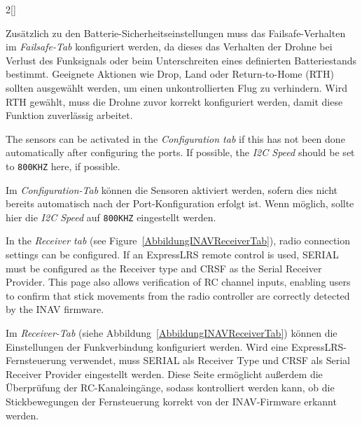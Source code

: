 \begin{paracol}{2}[]
\colger

Zusätzlich zu den Batterie-Sicherheitseinstellungen muss das Failsafe-Verhalten im \textsl{Failsafe-Tab} konfiguriert werden, da dieses das Verhalten der Drohne bei Verlust des Funksignals oder beim Unterschreiten eines definierten Batteriestands bestimmt. Geeignete Aktionen wie Drop, Land oder Return-to-Home (RTH) sollten ausgewählt werden, um einen unkontrollierten Flug zu verhindern. Wird RTH gewählt, muss die Drohne zuvor korrekt konfiguriert werden, damit diese Funktion zuverlässig arbeitet.

\coleng

The sensors can be activated in the \textsl{Configuration tab} if this has not been done automatically after configuring the ports. If possible, the \textsl{I2C Speed} should be set to \texttt{800KHZ} here, if possible.

\colger

Im \textsl{Configuration-Tab} können die Sensoren aktiviert werden, sofern dies nicht bereits automatisch nach der Port-Konfiguration erfolgt ist. Wenn möglich, sollte hier die \textsl{I2C Speed} auf \texttt{800KHZ} eingestellt werden.

\colende

\renewcommand{\deutschertitel}{Schritt 6: Konfiguration der Fernsteuerung}
\renewcommand{\englischertitel}{Step 6: Radio Configuration}
\makrounterabschnitt
\label{InavRadioConfig}

\coleng

In the \textsl{Receiver tab} (see Figure~\ref{AbbildungINAVReceiverTab}), radio connection settings can be configured. If an ExpressLRS remote control is used, SERIAL must be configured as the Receiver type and CRSF as the Serial Receiver Provider. This page also allows verification of RC channel inputs, enabling users to confirm that stick movements from the radio controller are correctly detected by the INAV firmware.

\colger

Im \textsl{Receiver-Tab} (siehe Abbildung~\ref{AbbildungINAVReceiverTab}) können die Einstellungen der Funkverbindung konfiguriert werden. Wird eine ExpressLRS-Fernsteuerung verwendet, muss SERIAL als Receiver Type und CRSF als Serial Receiver Provider eingestellt werden. Diese Seite ermöglicht außerdem die Überprüfung der RC-Kanaleingänge, sodass kontrolliert werden kann, ob die Stickbewegungen der Fernsteuerung korrekt von der INAV-Firmware erkannt werden.

\colende


\end{paracol}
